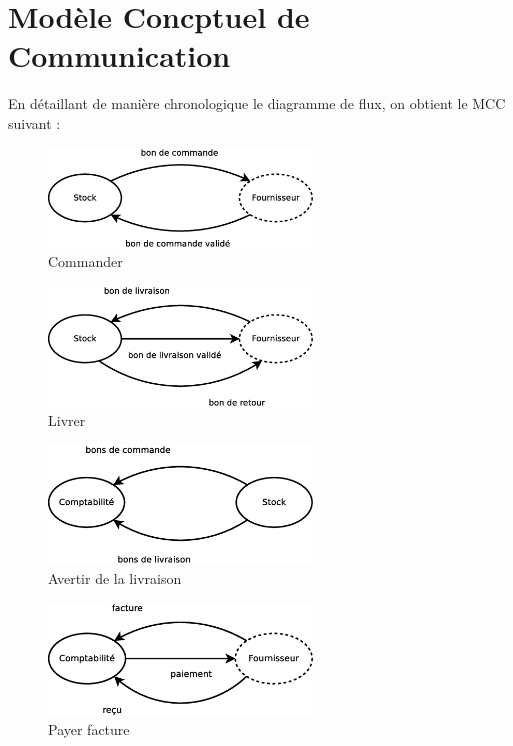 \section*{Modèle Concptuel de Communication}

En détaillant de manière chronologique le diagramme de flux, on obtient le MCC suivant :

\begin{figure}[!htb]
    \begin{center}
    \includegraphics[width=7cm]{images/mcc_commander.eps}
    \caption{\label{mcc_commander} Commander}
    \end{center}
\end{figure}

\begin{figure}[!htb]
    \begin{center}
    \includegraphics[width=7cm]{images/mcc_livrer.eps}
    \caption{\label{mcc_livrer} Livrer}
    \end{center}
\end{figure}

\begin{figure}[!htb]
    \begin{center}
    \includegraphics[width=7cm]{images/mcc_al.eps}
    \caption{\label{mcc_al} Avertir de la livraison}
    \end{center}
\end{figure}

\begin{figure}[!htb]
    \begin{center}
    \includegraphics[width=7cm]{images/mcc_payer.eps}
    \caption{\label{mcc_payer} Payer facture}
    \end{center}
\end{figure}

